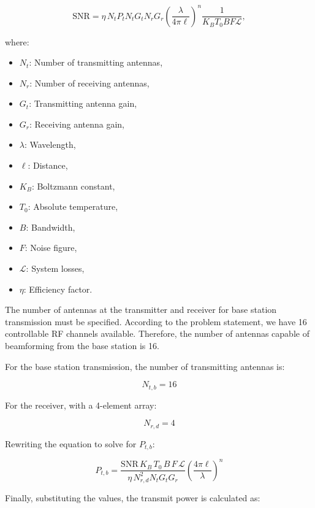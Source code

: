 \documentclass[12pt,onecolumn,a4paper]{article}
\begin{document}
\begin{equation}
	\text{SNR} = \eta \, N_t P_t N_t G_t N_r G_r \left( \frac{\lambda}{4 \pi \ell} \right)^n \frac{1}{K_B T_0 B F \mathcal{L}},
\end{equation}

where:
\begin{multicols}{2}
	\begin{itemize}
		\item \(N_t\): Number of transmitting antennas,
		\item \(N_r\): Number of receiving antennas,
		\item \(G_t\): Transmitting antenna gain,
		\item \(G_r\): Receiving antenna gain,
		\item \(\lambda\): Wavelength,
		\item \(\ell\): Distance,
		\item \(K_B\): Boltzmann constant,
		\item \(T_0\): Absolute temperature,
		\item \(B\): Bandwidth,
		\item \(F\): Noise figure,
		\item \(\mathcal{L}\): System losses,
		\item \(\eta\): Efficiency factor.
	\end{itemize}
\end{multicols}

The number of antennas at the transmitter and receiver for base station transmission must be specified. According to the problem statement, we have 16 controllable {RF} channels available. Therefore, the number of antennas capable of beamforming from the base station is 16.


For the base station transmission, the number of transmitting antennas is:

\[
N_{t,b} = 16
\]

For the receiver, with a 4-element array:

\[
N_{r,d} = 4
\]

Rewriting the equation to solve for \(P_{t,b}\):

\begin{equation}
	P_{t,b} = \frac{\text{SNR} \, K_B \, T_0 \, B \, F \, \mathcal{L}}{\eta \, N_{r,d}^2 N_t G_t G_r} \left( \frac{4 \pi \ell}{\lambda} \right)^n
\end{equation}

Finally, substituting the values, the transmit power is calculated as:
\end{document}
